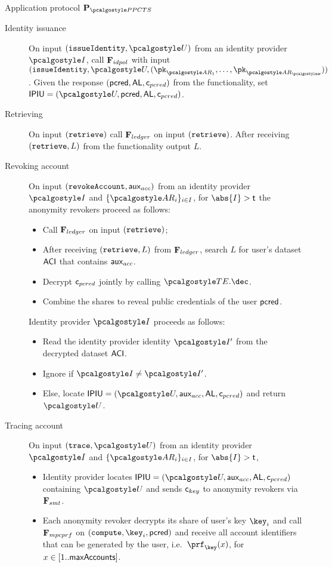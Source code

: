 \documentclass[runningheads,10pt]{llncs}
\numberwithin{equation}{section}
\begin{document}
\begin{protbox}{Application protocol $\prot{\PPCTS}$}
\begin{description}
  \item[Identity issuance] On input $(\issueIdentity, \user)$ from an identity
    provider $\idprov$, call $\mathbf{F}_{{idpol}}$ with input $(\issueIdentity, \user,
    (\pk_{\ar_1}, \ldots, \pk_{\ar_\noofar}))$. Given the response $(\mathsf{pcred},
    \mathsf{AL}, \mathsf{c}_{pcred})$ from the functionality, set $\ipiu = (\user, \pcred, \AL,
    \cuser)$.

  \item[Retrieving] On input $(\mathtt{retrieve})$ call $\mathbf{F}_{{ledger}}$ on input
    $(\mathtt{retrieve})$. After receiving $(\mathtt{retrieve}, L)$ from the functionality
    output $L$.

  \item[Revoking account] On input $(\mathtt{revokeAccount}, \mathsf{aux}_{acc})$ from an identity
    provider $\idprov$ and $\smallset{\ar_i}_{i \in I}$, for $\abs{I} >
    \thresholdar$ the anonymity revokers proceed as follows:
    \begin{itemize}
    \item Call $\mathbf{F}_{{ledger}}$ on input $(\mathtt{retrieve})$;
    \item After receiving $(\mathtt{retrieve}, L)$ from $\mathbf{F}_{{ledger}}$, search $L$ for
      user's dataset $\mathsf{ACI}$ that contains $\mathsf{aux}_{acc}$.
    \item Decrypt $\mathsf{c}_{pcred}$ jointly by calling $\TENC.\dec$.
    \item Combine the shares to reveal public credentials of the user $\mathsf{pcred}$.
    \end{itemize}
    Identity provider $\idprov$ proceeds as follows:
    \begin{itemize}
    \item Read the identity provider identity $\idprov'$ from the decrypted
      dataset $\mathsf{ACI}$.
    \item Ignore if $\idprov \neq \idprov'$.
    \item Else, locate $\ipiu = (\user, \auxacc, \AL, \cuser)$ and return
      $\user$.
    \end{itemize}

  \item[Tracing account] On input $(\trace, \user)$ from an identity provider
    $\idprov$ and $\smallset{\ar_i}_{i \in I}$, for $\abs{I} > \thresholdar$,
    \begin{itemize}
    \item Identity provider locates $\ipiu = (\user, \auxacc, \AL, \cuser)$
      containing $\user$ and sends $\mathsf{c}_{key}$ to anonymity revokers via
      $\mathbf{F}_{{smt}}$.
    \item Each anonymity revoker decrypts its share of user's key $\key_i$ and
      call $\mathbf{F}_{{mpcprf}}$ on $(\compute, \key_i, \pcred)$ and receive all
      account identifiers that can be generated by the user, i.e.~$\prf_\key
      (x)$, for $x \in [1 .. \mathsf{maxAccounts}]$.
    \end{itemize}
  \end{description}


\end{protbox}
\end{document}
